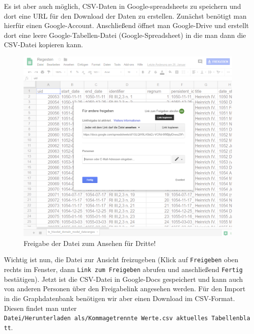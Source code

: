 \documentclass[ngerman,]{scrreprt}
\begin{document}
Es ist aber auch möglich, CSV-Daten in Google-spreadsheets zu speichern und dort eine URL für den Download der Daten zu erstellen. Zunächst benötigt man hierfür einen Google-Account. Anschließend öffnet man Google-Drive und erstellt dort eine leere Google-Tabellen-Datei (Google-Spreadsheet) in die man dann die CSV-Datei kopieren kann.

\begin{figure}
\centering
\includegraphics{Bilder/RI2Graph/google-docs-freigeben.png}
\caption{Freigabe der Datei zum Ansehen für Dritte!}
\end{figure}

Wichtig ist nun, die Datei zur Ansicht freizugeben (Klick auf \texttt{Freigeben} oben rechts im Fenster, dann \texttt{Link\ zum\ Freigeben} abrufen und anschließend \texttt{Fertig} bestätigen). Jetzt ist die CSV-Datei in Google-Docs gespeichert und kann auch von anderen Personen über den Freigabelink angesehen werden. Für den Import in die Graphdatenbank benötigen wir aber einen Download im CSV-Format. Diesen findet man unter \texttt{Datei/Herunterladen\ als/Kommagetrennte\ Werte.csv\ aktuelles\ Tabellenblatt}.
\end{document}

